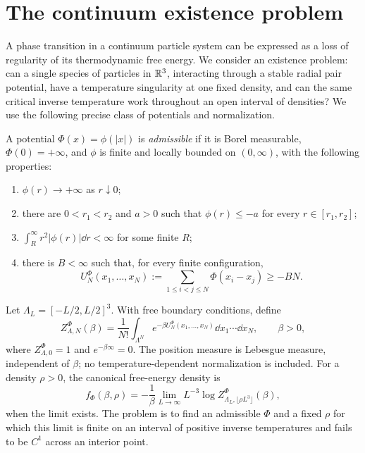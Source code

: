 \section{The continuum existence problem}\label{sec:introduction}
A phase transition in a continuum particle system can be expressed as a loss of
regularity of its thermodynamic free energy. We consider an existence problem:
can a single species of particles in $\mathbb R^3$, interacting through a stable radial
pair potential, have a temperature singularity at one fixed density, and can the same
critical inverse temperature work throughout an open interval of densities?
We use the following precise class of potentials and normalization.

A potential $\Phi(x)=\phi(|x|)$ is \emph{admissible} if it is Borel measurable,
$\Phi(0)=+\infty$, and $\phi$ is finite and locally bounded on $(0,\infty)$,
with the following properties:
\begin{enumerate}[label=(\roman*),leftmargin=*]
\item $\phi(r)\to+\infty$ as $r\downarrow0$;
\item there are $0<r_1<r_2$ and $a>0$ such that
      $\phi(r)\le-a$ for every $r\in[r_1,r_2]$;
\item $\int_R^\infty r^2|\phi(r)|\dd r<\infty$ for some finite $R$;
\item there is $B<\infty$ such that, for every finite configuration,
\begin{equation}\label{eq:stability-target}
 U_N^\Phi(x_1,\ldots,x_N):=\sum_{1\le i<j\le N}\Phi(x_i-x_j)\ge-BN.
\end{equation}
\end{enumerate}
Let $\Lambda_L=[-L/2,L/2]^3$. With free boundary conditions, define
\begin{equation}\label{eq:canonical-definition}
 Z_{\Lambda,N}^{\Phi}(\beta)=\frac1{N!}
 \int_{\Lambda^N}e^{-\beta U_N^\Phi(x_1,\ldots,x_N)}
 \dd x_1\cdots\dd x_N,\qquad \beta>0,
\end{equation}
where $Z_{\Lambda,0}^{\Phi}=1$ and $e^{-\beta\infty}=0$. The position
measure is Lebesgue measure, independent of $\beta$; no temperature-dependent
normalization is included.
For a density $\rho>0$, the canonical free-energy density is
\begin{equation}\label{eq:free-energy-definition}
 f_\Phi(\beta,\rho)=-\frac1\beta
 \lim_{L\to\infty}L^{-3}\log
 Z_{\Lambda_L,\lfloor\rho L^3\rfloor}^{\Phi}(\beta),
\end{equation}
when the limit exists. The problem is to find an admissible $\Phi$ and a fixed
$\rho$ for which this limit is finite on an interval of positive inverse
temperatures and fails to be $C^1$ across an interior point.

